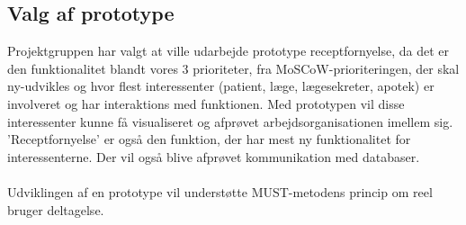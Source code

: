 \subsection{Valg af prototype}
Projektgruppen har valgt at ville udarbejde prototype receptfornyelse, da det er den funktionalitet blandt vores 3 prioriteter, fra MoSCoW-prioriteringen, der skal ny-udvikles og hvor flest interessenter (patient, læge, lægesekreter, apotek) er involveret og har interaktions med funktionen. Med prototypen vil disse interessenter kunne få visualiseret og afprøvet arbejdsorganisationen imellem sig. ’Receptfornyelse’ er også den funktion, der har mest ny funktionalitet for interessenterne. 
Der vil også blive afprøvet kommunikation med databaser. \\ 
\\
Udviklingen af en prototype vil understøtte MUST-metodens princip om reel bruger deltagelse.